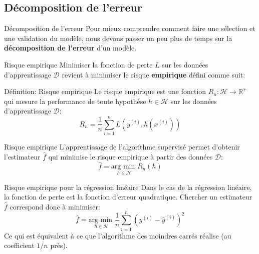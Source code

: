 \documentclass[10pt]{beamer}  %
\begin{document}
\subsection{Décomposition de l'erreur}

\begin{frame}{Décomposition de l'erreur}
	Pour mieux comprendre comment faire une sélection et une validation du modèle, nous devons passer un peu plus de temps sur la \textbf{décomposition de l'erreur} d'un modèle.
\end{frame}

\begin{frame}{Risque empirique}
	Minimiser la fonction de perte $L$ sur les données d'apprentissage $\mathcal{D}$ revient à minimiser le risque \textbf{empirique} défini comme suit:
	\begin{block}{Définition: Risque empirique}
		Le risque empirique est une fonction $R_n: \mathcal{H} \to \mathbb{R}^+$ qui mesure la performance de toute hypothèse $h \in \mathcal{H}$ sur les données d'apprentissage $\mathcal{D}$:
		\begin{equation}
			R_n = \frac{1}{n} \sum_{i=1}^n L\left(y^{(i)}, h\left(x^{(i)}\right)\right)
			\nonumber
		\end{equation}
		\hfill
	\end{block}
\end{frame}

\begin{frame}{Risque empirique}
	L'apprentissage de l'algorithme supervisé permet d'obtenir l'estimateur $\hat{f}$ qui minimise le risque empirique à partir des données $\mathcal{D}$:
	\begin{equation}
		\hat{f} = \underset{h \in \mathcal{H}}{\text{arg min  }}R_n(h)
		\nonumber
	\end{equation}
\end{frame}

\begin{frame}{Risque empirique pour la régression linéaire}
	Dans le cas de la régression linéaire, la fonction de perte est la fonction d'erreur quadratique. Chercher un estimateur $\hat{f}$ correspond donc à minimiser:
	\begin{equation}
		\hat{f} = \underset{h \in \mathcal{H}}{\text{arg min  }} \frac{1}{n} \sum_{i=1}^n \left( y^{(i)} - \hat{y}^{(i)}\right)^2
		\nonumber
	\end{equation}
	Ce qui est équivalent à ce que l'algorithme des moindres carrés réalise (au coefficient $1/n$ près).
\end{frame}
\end{document}
